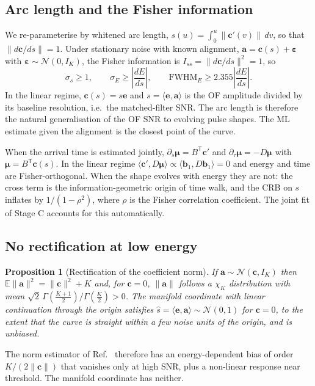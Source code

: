 \documentclass[aps,prapplied,reprint,superscriptaddress,longbibliography,nofootinbib]{revtex4-2}
\newtheorem{proposition}{Proposition}
\theoremstyle{remark}
\newcommand{\T}{\mathsf{T}}
\newcommand{\E}{\mathbb{E}}
\newcommand{\vect}[1]{\bm{#1}}
\begin{document}
\subsection{Arc length and the Fisher information}
We re-parameterise by whitened arc length,
$s(u)=\int_0^u\|\vect c'(v)\|\,dv$, so that $\|d\vect c/ds\|=1$. Under stationary
noise with known alignment, $\vect a=\vect c(s)+\vect\varepsilon$ with
$\vect\varepsilon\sim\mathcal N(0,I_K)$, the Fisher information is
$I_{ss}=\|d\vect c/ds\|^2=1$, so
\begin{equation}
\sigma_s\ge1,\qquad \sigma_E \ge \left|\frac{dE}{ds}\right|,\qquad
\mathrm{FWHM}_E\ge 2.355\left|\frac{dE}{ds}\right| .
\end{equation}
In the linear regime, $\vect c(s)=s\vect e$ and $s=\langle\vect e,\vect a\rangle$ is
the OF amplitude divided by its baseline resolution, i.e.\ the matched-filter SNR.
The arc length is therefore the natural generalisation of the OF SNR to evolving
pulse shapes. The ML estimate given the alignment is the closest point of the curve.

When the arrival time is estimated jointly, $\partial_s\vect\mu=B^\T\vect c'$ and
$\partial_\tau\vect\mu=-D\vect\mu$ with $\vect\mu=B^\T\vect c(s)$. In the linear
regime $\langle\vect c',D\vect\mu\rangle\propto\langle\vect b_1,D\vect b_1\rangle=0$
and energy and time are Fisher-orthogonal. When the shape evolves with energy they
are not: the cross term is the information-geometric origin of time walk, and the
CRB on $s$ inflates by $1/(1-\rho^2)$, where $\rho$ is the Fisher correlation
coefficient. The joint fit of Stage C accounts for this automatically.

\subsection{No rectification at low energy}
\begin{proposition}[Rectification of the coefficient norm]\label{prop:rician}
If $\vect a\sim\mathcal N(\vect c,I_K)$ then $\E\|\vect a\|^2=\|\vect c\|^2+K$ and,
for $\vect c=0$, $\|\vect a\|$ follows a $\chi_K$ distribution with mean
$\sqrt2\,\Gamma(\frac{K+1}2)/\Gamma(\frac K2)>0$. The manifold coordinate with
linear continuation through the origin satisfies $\hat s=\langle\vect e,\vect
a\rangle\sim\mathcal N(0,1)$ for $\vect c=0$, to the extent that the curve is
straight within a few noise units of the origin, and is unbiased.
\end{proposition}
The norm estimator of Ref.~\cite{Yu2019} therefore has an energy-dependent bias of
order $K/(2\|\vect c\|)$ that vanishes only at high SNR, plus a non-linear response
near threshold. The manifold coordinate has neither.
\end{document}
